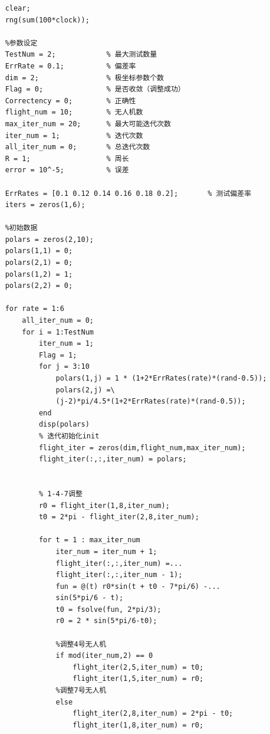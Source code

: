 \documentclass{my_paper}
\begin{document}
\begin{lstlisting}
    clear;
    rng(sum(100*clock));
    
    %参数设定
    TestNum = 2;            % 最大测试数量
    ErrRate = 0.1;          % 偏差率
    dim = 2;                % 极坐标参数个数
    Flag = 0;               % 是否收敛（调整成功）
    Correctency = 0;        % 正确性
    flight_num = 10;        % 无人机数
    max_iter_num = 20;      % 最大可能迭代次数
    iter_num = 1;           % 迭代次数
    all_iter_num = 0;       % 总迭代次数
    R = 1;                  % 周长
    error = 10^-5;          % 误差
    
    ErrRates = [0.1 0.12 0.14 0.16 0.18 0.2];       % 测试偏差率
    iters = zeros(1,6);
    
    %初始数据
    polars = zeros(2,10);   
    polars(1,1) = 0;
    polars(2,1) = 0;
    polars(1,2) = 1;
    polars(2,2) = 0;
    
    for rate = 1:6
        all_iter_num = 0;
        for i = 1:TestNum
            iter_num = 1;      
            Flag = 1;
            for j = 3:10
                polars(1,j) = 1 * (1+2*ErrRates(rate)*(rand-0.5));
                polars(2,j) =\ 
                (j-2)*pi/4.5*(1+2*ErrRates(rate)*(rand-0.5));
            end
            disp(polars)
            % 迭代初始化init
            flight_iter = zeros(dim,flight_num,max_iter_num);
            flight_iter(:,:,iter_num) = polars;
            
            
            % 1-4-7调整
            r0 = flight_iter(1,8,iter_num);
            t0 = 2*pi - flight_iter(2,8,iter_num);
            
            for t = 1 : max_iter_num
                iter_num = iter_num + 1;
                flight_iter(:,:,iter_num) =...
                flight_iter(:,:,iter_num - 1);
                fun = @(t) r0*sin(t + t0 - 7*pi/6) -...
                sin(5*pi/6 - t);
                t0 = fsolve(fun, 2*pi/3);  
                r0 = 2 * sin(5*pi/6-t0);   
            
                %调整4号无人机
                if mod(iter_num,2) == 0    
                    flight_iter(2,5,iter_num) = t0;
                    flight_iter(1,5,iter_num) = r0;
                %调整7号无人机
                else 
                    flight_iter(2,8,iter_num) = 2*pi - t0;
                    flight_iter(1,8,iter_num) = r0;
                    

\end{lstlisting}
\end{document}
